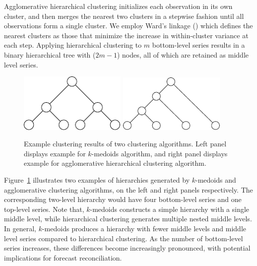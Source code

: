 \documentclass[a4paper,review,12pt,authoryear]{elsarticle}
\begin{document}
Agglomerative hierarchical clustering initializes each observation in its own cluster, and then merges the nearest two clusters in a stepwise fashion until all observations form a single cluster. We employ Ward's linkage (\citealp{murtaghWardHierarchicalAgglomerative2014a}) which defines the nearest clusters as those that minimize the increase in within-cluster variance at each step. Applying hierarchical clustering to $m$ bottom-level series results in a binary hierarchical tree with ($2m-1$) nodes, all of which are retained as middle level series. 


\begin{figure}[h!]
    \centering
    \vspace{0.2in}
    \includegraphics[width=0.46\textwidth]{figures/pamcluster.pdf}
    \hspace{1cm}
    \includegraphics[width=0.46\textwidth]{figures/aggcluster.pdf}
    \caption{\label{fig:cluster_example}Example clustering results of two clustering algorithms. Left panel displays example for $k$-medoids algorithm, and right panel displays example for agglomerative hierarchical clustering algorithm.}
\end{figure}
Figure~\ref{fig:cluster_example} illustrates two examples of hierarchies generated by $k$-medoids and agglomerative clustering algorithms, on the left and right panels respectively. The corresponding two-level hierarchy would have four bottom-level series and one top-level series. %
Note that, $k$-medoids constructs a simple hierarchy with a single middle level, while hierarchical clustering generates multiple nested middle levels. 
In general, $k$-medoids produces a hierarchy with fewer middle levels and middle level series compared to hierarchical clustering. As the number of bottom-level series increases, these differences become increasingly pronounced, with potential implications for forecast reconciliation.
\end{document}
